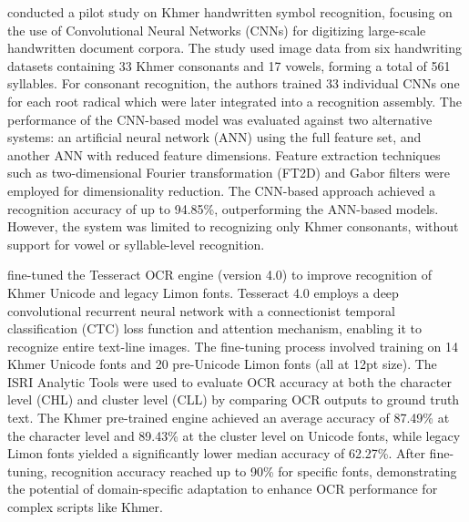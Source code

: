 {\citet{Annanurov_2018} conducted a pilot study on Khmer handwritten 
symbol recognition, focusing on the use of Convolutional Neural 
Networks (CNNs) for digitizing large-scale handwritten document corpora. 
The study used image data from six handwriting datasets containing 
33 Khmer consonants and 17 vowels, forming a total of 561 syllables. 
For consonant recognition, the authors trained 33 individual CNNs one 
for each root radical which were later integrated into a recognition 
assembly. The performance of the CNN-based model was evaluated against 
two alternative systems: an artificial neural network (ANN) using the 
full feature set, and another ANN with reduced feature dimensions. 
Feature extraction techniques such as two-dimensional Fourier 
transformation (FT2D) and Gabor filters were employed for dimensionality 
reduction. The CNN-based approach achieved a recognition accuracy of 
up to 94.85\%, outperforming the ANN-based models. However, the system 
was limited to recognizing only Khmer consonants, without support for 
vowel or syllable-level recognition.

\citet{sokphyrum2019khmer} fine-tuned the Tesseract OCR engine 
(version 4.0) to improve recognition of Khmer Unicode and legacy 
Limon fonts. Tesseract 4.0 employs a deep convolutional recurrent 
neural network with a connectionist temporal classification (CTC) 
loss function and attention mechanism, enabling it to recognize entire 
text-line images. The fine-tuning process involved training on 14 Khmer 
Unicode fonts and 20 pre-Unicode Limon fonts (all at 12pt size). 
The ISRI Analytic Tools were used to evaluate OCR accuracy at both 
the character level (CHL) and cluster level (CLL) by comparing OCR 
outputs to ground truth text. The Khmer pre-trained engine achieved 
an average accuracy of 87.49\% at the character level and 89.43\% at 
the cluster level on Unicode fonts, while legacy Limon fonts yielded 
a significantly lower median accuracy of 62.27\%. After fine-tuning, 
recognition accuracy reached up to 90\% for specific fonts, demonstrating 
the potential of domain-specific adaptation to enhance OCR performance 
for complex scripts like Khmer.


}
